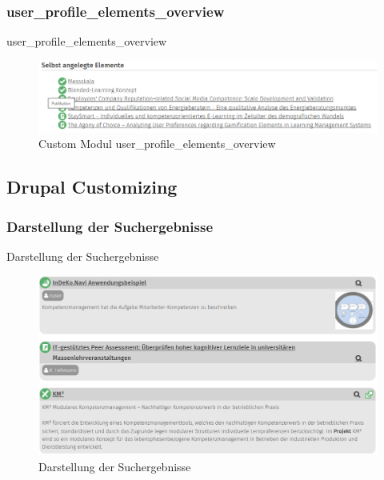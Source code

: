 \subsubsection{user\_profile\_elements\_overview}\label{subsub:userprofileelementsoverview}
user\_profile\_elements\_overview
\begin{figure}[H]
	\centering
	\includegraphics[width=0.80\linewidth]{images/example_userprofile}
	\caption{Custom Modul user\_profile\_elements\_overview}
	\label{fig:example_userprofile}
\end{figure}




\newpage
\subsection{Drupal Customizing}\label{sub:drupal_customizing}


\subsubsection{Darstellung der Suchergebnisse}\label{subsub:suchergebnisse}
Darstellung der Suchergebnisse
\begin{figure}[H]
	\centering
	\includegraphics[height=0.20\textheight]{images/example_searchresult}
	\caption{Darstellung der Suchergebnisse}
	\label{fig:example_searchresult}
\end{figure}


